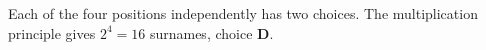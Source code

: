 Each of the four positions independently has two choices. The multiplication principle gives $2^4=\boxed{16}$ surnames, choice \textbf{D}.
